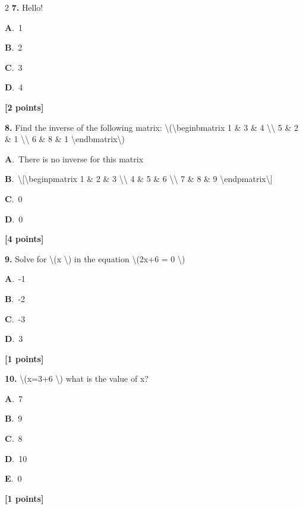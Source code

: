 \documentclass[12pt]{article}
\newcommand{\choice}[3]{%
  \noindent\textbf{#1}.~#2\hfill#3\par\vspace{0.25em}
}
\begin{document}
\begin{multicols}{2}
\noindent \textbf{\textenglish{7.}} {\textenglish{Hello!}}

\noindent\choice{A}{{\textenglish{1}}}{}
\noindent\choice{B}{{\textenglish{2}}}{}
\noindent\choice{C}{{\textenglish{3}}}{}
\noindent\choice{D}{{\textenglish{4}}}{}
\hfill \textbf{[2 points]}\vspace{0.5em}

\noindent \textbf{\textenglish{8.}} {\textenglish{Find the inverse of the following matrix: \textbackslash{}(\textbackslash{}begin{bmatrix} 1 \& 3 \& 4 \textbackslash{}\textbackslash{} 5 \& 2 \& 1 \textbackslash{}\textbackslash{} 6 \& 8 \& 1 \textbackslash{}end{bmatrix}\textbackslash{})}}

\noindent\choice{A}{{\textenglish{There is no inverse for this matrix}}}{}
\noindent\choice{B}{{\textenglish{\textbackslash{}[\textbackslash{}begin{pmatrix} 1 \& 2 \& 3 \textbackslash{}\textbackslash{} 4 \& 5 \& 6 \textbackslash{}\textbackslash{} 7 \& 8 \& 9  \textbackslash{}end{pmatrix}\textbackslash{}]}}}{}
\noindent\choice{C}{{\textenglish{0}}}{}
\noindent\choice{D}{{\textenglish{0}}}{}
\hfill \textbf{[4 points]}\vspace{0.5em}

\noindent \textbf{\textenglish{9.}} {\textenglish{Solve for \textbackslash{}(x \textbackslash{}) in the equation \textbackslash{}(2x+6 = 0 \textbackslash{})}}

\noindent\choice{A}{{\textenglish{-1}}}{}
\noindent\choice{B}{{\textenglish{-2}}}{}
\noindent\choice{C}{{\textenglish{-3}}}{}
\noindent\choice{D}{{\textenglish{3}}}{}
\hfill \textbf{[1 points]}\vspace{0.5em}

\noindent \textbf{\textenglish{10.}} {\textenglish{\textbackslash{}(x=3+6 \textbackslash{}) what is the value of x?}}

\noindent\choice{A}{{\textenglish{7}}}{}
\noindent\choice{B}{{\textenglish{9}}}{}
\noindent\choice{C}{{\textenglish{8}}}{}
\noindent\choice{D}{{\textenglish{10}}}{}
\noindent\choice{E}{{\textenglish{0}}}{}
\hfill \textbf{[1 points]}\vspace{0.5em}


\end{multicols}
\end{document}
